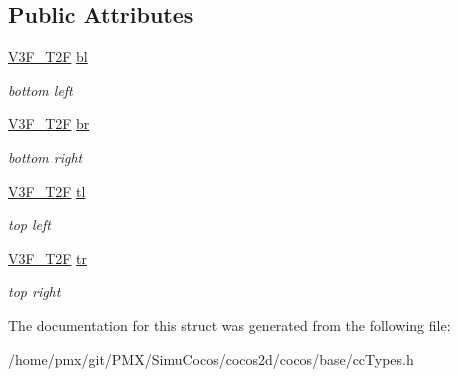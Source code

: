 \subsection*{Public Attributes}
\begin{DoxyCompactItemize}
\item 
\mbox{\label{structV3F__T2F__Quad_a87db686a712b88fac6e1010858beb7c7}} 
\hyperlink{structV3F__T2F}{V3\+F\+\_\+\+T2F} \hyperlink{structV3F__T2F__Quad_a87db686a712b88fac6e1010858beb7c7}{bl}
\begin{DoxyCompactList}\small\item\em bottom left \end{DoxyCompactList}\item 
\mbox{\label{structV3F__T2F__Quad_a1f8dfb13879c3816ef33d5be3bc0b3aa}} 
\hyperlink{structV3F__T2F}{V3\+F\+\_\+\+T2F} \hyperlink{structV3F__T2F__Quad_a1f8dfb13879c3816ef33d5be3bc0b3aa}{br}
\begin{DoxyCompactList}\small\item\em bottom right \end{DoxyCompactList}\item 
\mbox{\label{structV3F__T2F__Quad_a568e67439d389d021e2340b9bc39cbba}} 
\hyperlink{structV3F__T2F}{V3\+F\+\_\+\+T2F} \hyperlink{structV3F__T2F__Quad_a568e67439d389d021e2340b9bc39cbba}{tl}
\begin{DoxyCompactList}\small\item\em top left \end{DoxyCompactList}\item 
\mbox{\label{structV3F__T2F__Quad_a71a6d5ac422e72bf0874990cc970849f}} 
\hyperlink{structV3F__T2F}{V3\+F\+\_\+\+T2F} \hyperlink{structV3F__T2F__Quad_a71a6d5ac422e72bf0874990cc970849f}{tr}
\begin{DoxyCompactList}\small\item\em top right \end{DoxyCompactList}\end{DoxyCompactItemize}


The documentation for this struct was generated from the following file\+:\begin{DoxyCompactItemize}
\item 
/home/pmx/git/\+P\+M\+X/\+Simu\+Cocos/cocos2d/cocos/base/cc\+Types.\+h\end{DoxyCompactItemize}
